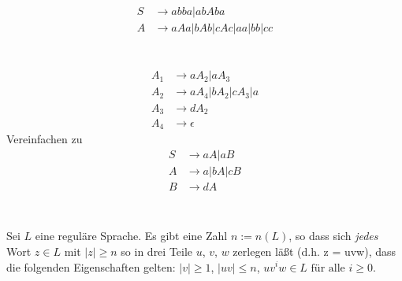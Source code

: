 \documentclass{article}
\begin{document}
\section{}%
\begin{align*}
S &\rightarrow abba | abAba \\
A &\rightarrow aAa | bAb | cAc | aa | bb | cc
\end{align*}

\section{}%

\section{}%
\begin{align*}
A_1 &\rightarrow aA_2 | aA_3 \\
A_2 &\rightarrow aA_4 | bA_2 | cA_3 | a\\
A_3 &\rightarrow dA_2 \\
A_4 &\rightarrow \epsilon
\end{align*}
Vereinfachen zu
\begin{align*}
S &\rightarrow aA | aB \\
A &\rightarrow a | bA | cB\\
B &\rightarrow dA \\
\end{align*}

\section{}%
\subsection{}%
Sei $L$ eine reguläre Sprache. Es gibt eine Zahl $n:=n(L)$, so dass sich \emph{jedes} Wort $z \in L$ mit $|z| \geq n$ so in drei Teile $u$, $v$, $w$ zerlegen läßt (d.h. z = uvw), dass die folgenden Eigenschaften gelten: $|v| \geq 1$, $|uv| \leq n$, $uv^iw \in L \text{ für alle } i \geq 0$.
\end{document}
